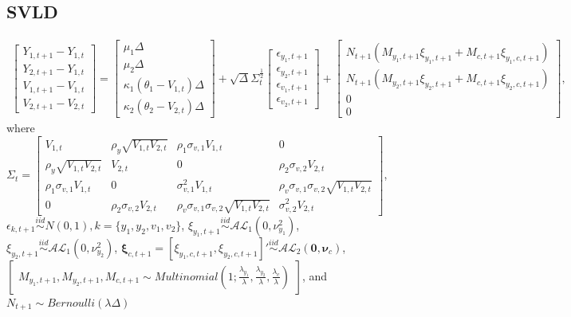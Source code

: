 \documentclass{article}\usepackage[]{graphicx}\usepackage[]{color}
\begin{document}
\subsection{SVLD}

\begin{align}
    \begin{bmatrix} Y_{1,t + 1} - Y_{1,t} \\ Y_{2,t + 1} - Y_{1,t} \\ V_{1,t + 1} - V_{1,t} \\ V_{2,t + 1} - V_{2,t} \end{bmatrix} = \begin{bmatrix} \mu_1 \Delta \\ \mu_2 \Delta \\ \kappa_1(\theta_1 - V_{1,t}) \Delta \\ \kappa_2(\theta_2 - V_{2,t}) \Delta \end{bmatrix} + \sqrt{\Delta}\Sigma_t^{\frac{1}{2}} \begin{bmatrix} \epsilon_{y_1,t+1} \\ \epsilon_{y_2,t+1} \\ \epsilon_{v_1,t+1} \\ \epsilon_{v_2,t+1} \end{bmatrix} + \begin{bmatrix} N_{t+1}(M_{y_1,t+1} \xi_{y_1, t+1} + M_{c,t+1} \xi_{y_1,c,t+1}) \\ N_{t+1}(M_{y_2,t+1} \xi_{y_2, t+1} + M_{c,t+1} \xi_{y_2,c,t+1}) \\ 0 \\ 0 \end{bmatrix}, \label{S_tdisc_2d}
\end{align}
where $\Sigma_{t} = \begin{bmatrix} V_{1,t} & \rho_y \sqrt{V_{1,t}V_{2,t}} & \rho_1 \sigma_{v,1} V_{1,t} & 0 \\ \rho_y \sqrt{V_{1,t}V_{2,t}} & V_{2,t} & 0 & \rho_2 \sigma_{v,2} V_{2,t} \\ \rho_1 \sigma_{v,1} V_{1,t} & 0 & \sigma_{v,1}^2 V_{1,t} & \rho_v \sigma_{v,1}\sigma_{v,2} \sqrt{V_{1,t} V_{2,t}} \\ 0 & \rho_2 \sigma_{v,2} V_{2,t} & \rho_v \sigma_{v,1}\sigma_{v,2} \sqrt{V_{1,t} V_{2,t}} & \sigma_{v,2}^2 V_{2,t} \end{bmatrix}$, \\$\epsilon_{k,t+1} \overset{iid}{\sim} N(0,1), k = \{y_1,y_2,v_1,v_2\}$, $\xi_{y_1,t+1} \overset{iid}{\sim} \mathcal{AL}_1(0, \nu_{y_1}^2)$, $\xi_{y_2,t+1} \overset{iid}{\sim} \mathcal{AL}_1(0, \nu_{y_2}^2)$, $\boldsymbol{\xi}_{c,t+1} = [\xi_{y_1,c,t+1}, \xi_{y_2,c,t+1}]' \overset{iid}{\sim} \mathcal{AL}_2(\boldsymbol{0}, \boldsymbol{\nu}_c)$, $\begin{bmatrix}
M_{y_1,t+1},M_{y_2,t+1},M_{c,t+1} \sim Multinomial(1;\frac{\lambda_{y_1}}{\lambda},\frac{\lambda_{y_2}}{\lambda},\frac{\lambda_c}{\lambda})
\end{bmatrix}$, and $N_{t+1} \sim Bernoulli(\lambda\Delta)$
\end{document}
